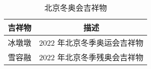 \documentclass{ctexart}
\begin{document}
\begin{table}[ht]
    \centering
    \caption{北京冬奥会吉祥物}\label{tab:mascot}
    \begin{tabular}{lp{3cm}}
        \toprule
        \multicolumn{1}{c}{吉祥物} & \multicolumn{1}{c}{描述}    \\
        \midrule
        冰墩墩                     & 2022 年北京冬季奥运会吉祥物 \\
        雪容融                     & 2022 年北京冬季残奥会吉祥物 \\
        \bottomrule
    \end{tabular}
\end{table}
\end{document}
